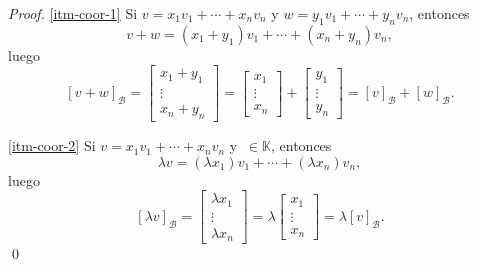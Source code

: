 \documentclass[handout]{beamer} %
\newcommand{\K}{\mathbb K}
\begin{document}
\begin{frame}
	\begin{proof}
        \ref{itm-coor-1} Si \;$v = x_1v_1 + \cdots +x_nv_n$\; y \;$w = y_1v_1 + \cdots +y_nv_n$, \;entonces 
        $$
        v + w = (x_1+y_1)v_1 + \cdots +(x_n+y_n)v_n,
        $$
        luego
        $$
        [v + w]_\mathcal{B} = \begin{bmatrix}x_1+y_1 \\ \vdots \\ x_n+y_n\end{bmatrix}
        = \begin{bmatrix}x_1 \\ \vdots \\ x_n\end{bmatrix}+\begin{bmatrix}y_1 \\ \vdots \\ y_n\end{bmatrix} = [v]_\mathcal{B} +[w]_\mathcal{B}.
        $$
        
        \ref{itm-coor-2} Si $v = x_1v_1 + \cdots +x_nv_n$ y $\ \in \K$, entonces 
        $$
        \lambda v = (\lambda x_1)v_1 + \cdots +(\lambda x_n)v_n,
        $$
        luego
        $$
        [\lambda v ]_\mathcal{B} = \begin{bmatrix}\lambda x_1 \\ \vdots \\ \lambda x_n\end{bmatrix}
        = \lambda \begin{bmatrix}x_1 \\ \vdots \\ x_n\end{bmatrix} = \lambda [v]_\mathcal{B}.
        $$\qed
    \end{proof}
\end{frame}


\end{document}
